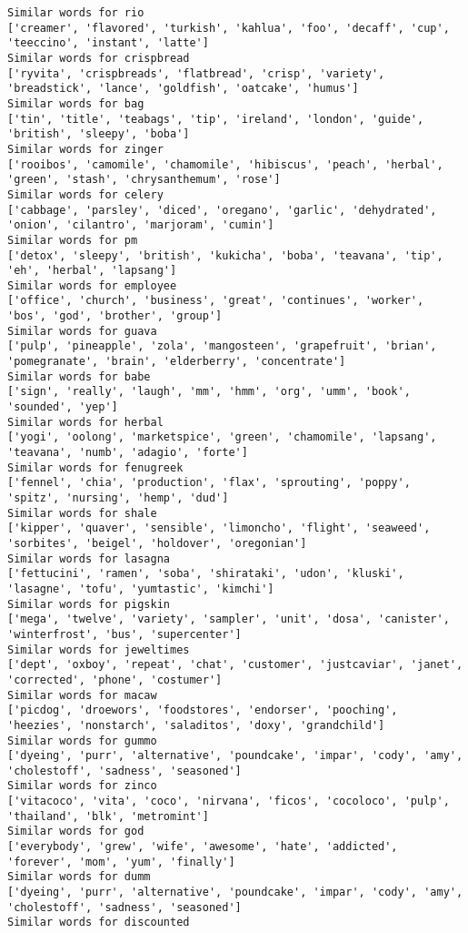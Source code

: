 \documentclass[11pt]{article}
\begin{document}
\begin{Verbatim}[commandchars=\\\{\}]
Similar words for rio
['creamer', 'flavored', 'turkish', 'kahlua', 'foo', 'decaff', 'cup', 'teeccino', 'instant', 'latte']
Similar words for crispbread
['ryvita', 'crispbreads', 'flatbread', 'crisp', 'variety', 'breadstick', 'lance', 'goldfish', 'oatcake', 'humus']
Similar words for bag
['tin', 'title', 'teabags', 'tip', 'ireland', 'london', 'guide', 'british', 'sleepy', 'boba']
Similar words for zinger
['rooibos', 'camomile', 'chamomile', 'hibiscus', 'peach', 'herbal', 'green', 'stash', 'chrysanthemum', 'rose']
Similar words for celery
['cabbage', 'parsley', 'diced', 'oregano', 'garlic', 'dehydrated', 'onion', 'cilantro', 'marjoram', 'cumin']
Similar words for pm
['detox', 'sleepy', 'british', 'kukicha', 'boba', 'teavana', 'tip', 'eh', 'herbal', 'lapsang']
Similar words for employee
['office', 'church', 'business', 'great', 'continues', 'worker', 'bos', 'god', 'brother', 'group']
Similar words for guava
['pulp', 'pineapple', 'zola', 'mangosteen', 'grapefruit', 'brian', 'pomegranate', 'brain', 'elderberry', 'concentrate']
Similar words for babe
['sign', 'really', 'laugh', 'mm', 'hmm', 'org', 'umm', 'book', 'sounded', 'yep']
Similar words for herbal
['yogi', 'oolong', 'marketspice', 'green', 'chamomile', 'lapsang', 'teavana', 'numb', 'adagio', 'forte']
Similar words for fenugreek
['fennel', 'chia', 'production', 'flax', 'sprouting', 'poppy', 'spitz', 'nursing', 'hemp', 'dud']
Similar words for shale
['kipper', 'quaver', 'sensible', 'limoncho', 'flight', 'seaweed', 'sorbites', 'beigel', 'holdover', 'oregonian']
Similar words for lasagna
['fettucini', 'ramen', 'soba', 'shirataki', 'udon', 'kluski', 'lasagne', 'tofu', 'yumtastic', 'kimchi']
Similar words for pigskin
['mega', 'twelve', 'variety', 'sampler', 'unit', 'dosa', 'canister', 'winterfrost', 'bus', 'supercenter']
Similar words for jeweltimes
['dept', 'oxboy', 'repeat', 'chat', 'customer', 'justcaviar', 'janet', 'corrected', 'phone', 'costumer']
Similar words for macaw
['picdog', 'droewors', 'foodstores', 'endorser', 'pooching', 'heezies', 'nonstarch', 'saladitos', 'doxy', 'grandchild']
Similar words for gummo
['dyeing', 'purr', 'alternative', 'poundcake', 'impar', 'cody', 'amy', 'cholestoff', 'sadness', 'seasoned']
Similar words for zinco
['vitacoco', 'vita', 'coco', 'nirvana', 'ficos', 'cocoloco', 'pulp', 'thailand', 'blk', 'metromint']
Similar words for god
['everybody', 'grew', 'wife', 'awesome', 'hate', 'addicted', 'forever', 'mom', 'yum', 'finally']
Similar words for dumm
['dyeing', 'purr', 'alternative', 'poundcake', 'impar', 'cody', 'amy', 'cholestoff', 'sadness', 'seasoned']
Similar words for discounted

\end{Verbatim}
\end{document}
